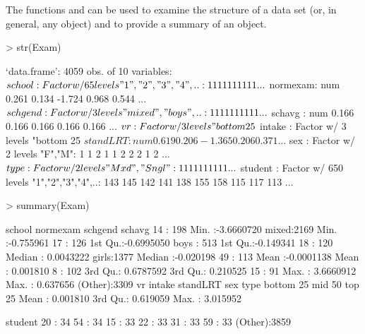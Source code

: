 \documentclass[12pt]{article}
\begin{document}
The \RR{} functions  and  can be used to
examine the structure of a data set (or, in general, any \RR{} object)
and to provide a summary of an object.
\begin{Schunk}
\begin{Sinput}
> str(Exam)
\end{Sinput}
\begin{Soutput}
`data.frame':	4059 obs. of  10 variables:
 $ school  : Factor w/ 65 levels "1","2","3","4",..: 1 1 1 1 1 1 1 1 1 1 ...
 $ normexam: num   0.261  0.134 -1.724  0.968  0.544 ...
 $ schgend : Factor w/ 3 levels "mixed","boys",..: 1 1 1 1 1 1 1 1 1 1 ...
 $ schavg  : num  0.166 0.166 0.166 0.166 0.166 ...
 $ vr      : Factor w/ 3 levels "bottom 25%
 $ intake  : Factor w/ 3 levels "bottom 25%
 $ standLRT: num   0.619  0.206 -1.365  0.206  0.371 ...
 $ sex     : Factor w/ 2 levels "F","M": 1 1 2 1 1 2 2 2 1 2 ...
 $ type    : Factor w/ 2 levels "Mxd","Sngl": 1 1 1 1 1 1 1 1 1 1 ...
 $ student : Factor w/ 650 levels "1","2","3","4",..: 143 145 142 141 138 155 158 115 117 113 ...
\end{Soutput}
\begin{Sinput}
> summary(Exam)
\end{Sinput}
\begin{Soutput}
     school        normexam           schgend         schavg         
 14     : 198   Min.   :-3.6660720   mixed:2169   Min.   :-0.755961  
 17     : 126   1st Qu.:-0.6995050   boys : 513   1st Qu.:-0.149341  
 18     : 120   Median : 0.0043222   girls:1377   Median :-0.020198  
 49     : 113   Mean   :-0.0001138                Mean   : 0.001810  
 8      : 102   3rd Qu.: 0.6787592                3rd Qu.: 0.210525  
 15     :  91   Max.   : 3.6660912                Max.   : 0.637656  
 (Other):3309                                                        
          vr              intake        standLRT         sex        type     
 bottom 25%
 mid 50%
 top 25%
                                     Mean   : 0.001810                       
                                     3rd Qu.: 0.619059                       
                                     Max.   : 3.015952                       
                                                                             
    student    
 20     :  34  
 54     :  34  
 15     :  33  
 22     :  33  
 31     :  33  
 59     :  33  
 (Other):3859  
\end{Soutput}
\end{Schunk}
\end{document}
